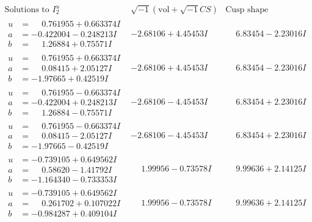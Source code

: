 \documentclass[1p]{elsarticle_modified}
\theoremstyle{definition}
\newcommand{\I}{\sqrt{-1}}
\begin{document}
$$\begin{array}{c|c|c}  
\text{Solutions to }I^u_{2}& \I (\text{vol} + \sqrt{-1}CS) & \text{Cusp shape}\\
 \hline 
\begin{aligned}
u &= \phantom{-}0.761955 + 0.663374 I \\
a &= -0.422004 - 0.248213 I \\
b &= \phantom{-}1.26884 + 0.75571 I\end{aligned}
 & -2.68106 + 4.45453 I & \phantom{-}6.83454 - 2.23016 I \\ \hline\begin{aligned}
u &= \phantom{-}0.761955 + 0.663374 I \\
a &= \phantom{-}0.08415 + 2.05127 I \\
b &= -1.97665 + 0.42519 I\end{aligned}
 & -2.68106 + 4.45453 I & \phantom{-}6.83454 - 2.23016 I \\ \hline\begin{aligned}
u &= \phantom{-}0.761955 - 0.663374 I \\
a &= -0.422004 + 0.248213 I \\
b &= \phantom{-}1.26884 - 0.75571 I\end{aligned}
 & -2.68106 - 4.45453 I & \phantom{-}6.83454 + 2.23016 I \\ \hline\begin{aligned}
u &= \phantom{-}0.761955 - 0.663374 I \\
a &= \phantom{-}0.08415 - 2.05127 I \\
b &= -1.97665 - 0.42519 I\end{aligned}
 & -2.68106 - 4.45453 I & \phantom{-}6.83454 + 2.23016 I \\ \hline\begin{aligned}
u &= -0.739105 + 0.649562 I \\
a &= \phantom{-}0.58620 - 1.41792 I \\
b &= -1.164340 - 0.733353 I\end{aligned}
 & \phantom{-}1.99956 - 0.73578 I & \phantom{-}9.99636 + 2.14125 I \\ \hline\begin{aligned}
u &= -0.739105 + 0.649562 I \\
a &= \phantom{-}0.261702 + 0.107022 I \\
b &= -0.984287 + 0.409104 I\end{aligned}
 & \phantom{-}1.99956 - 0.73578 I & \phantom{-}9.99636 + 2.14125 I \\ \hline\begin{aligned}

\end{aligned}
\end{array}$$
\end{document}
